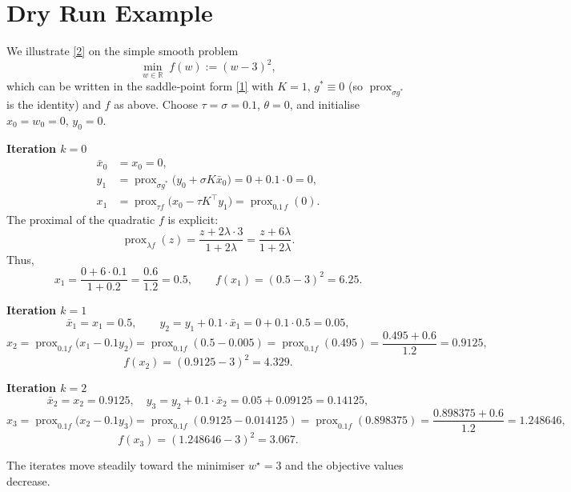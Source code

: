 \documentclass{article}
\newcommand{\prox}{\operatorname{prox}}
\begin{document}
\section*{Dry Run Example}
We illustrate \eqref{2} on the simple smooth problem
\[
\min_{w\in\mathbb{R}} \; f(w):=(w-3)^{2},
\tag{4}
\]
which can be written in the saddle‑point form \eqref{1} with $K=1$, $g^{*}\equiv0$ (so $\prox_{\sigma g^{*}}$ is the identity) and $f$ as above.  
Choose $\tau=\sigma=0.1$, $\theta=0$, and initialise $x_{0}=w_{0}=0$, $y_{0}=0$.

\medskip
\noindent\textbf{Iteration $k=0$}
\begin{align*}
\bar x_{0} &= x_{0}=0,\\
y_{1} &= \prox_{\sigma g^{*}}\bigl(y_{0}+\sigma K\bar x_{0}\bigr)=0+0.1\cdot0=0,\\
x_{1} &= \prox_{\tau f}\bigl(x_{0}-\tau K^{\top}y_{1}\bigr)
      = \prox_{0.1\,f}(0) .
\end{align*}
The proximal of the quadratic $f$ is explicit:
\[
\prox_{\lambda f}(z)=\frac{z+2\lambda\cdot3}{1+2\lambda}= \frac{z+6\lambda}{1+2\lambda}.
\]
Thus,
\[
x_{1}= \frac{0+6\cdot0.1}{1+0.2}= \frac{0.6}{1.2}=0.5,
\qquad
f(x_{1})=(0.5-3)^{2}=6.25 .
\]

\noindent\textbf{Iteration $k=1$}
\[
\bar x_{1}=x_{1}=0.5,
\qquad
y_{2}= y_{1}+0.1\cdot\bar x_{1}=0+0.1\cdot0.5=0.05,
\]
\[
x_{2}= \prox_{0.1 f}\bigl(x_{1}-0.1 y_{2}\bigr)
      =\prox_{0.1 f}(0.5-0.005)=\prox_{0.1 f}(0.495)
      =\frac{0.495+0.6}{1.2}=0.9125,
\]
\[
f(x_{2})=(0.9125-3)^{2}=4.329.
\]

\noindent\textbf{Iteration $k=2$}
\[
\bar x_{2}=x_{2}=0.9125,\quad
y_{3}= y_{2}+0.1\cdot\bar x_{2}=0.05+0.09125=0.14125,
\]
\[
x_{3}= \prox_{0.1 f}\bigl(x_{2}-0.1 y_{3}\bigr)
      =\prox_{0.1 f}(0.9125-0.014125)=\prox_{0.1 f}(0.898375)
      =\frac{0.898375+0.6}{1.2}=1.248646,
\]
\[
f(x_{3})=(1.248646-3)^{2}=3.067.
\]

The iterates move steadily toward the minimiser $w^{\star}=3$ and the objective values decrease.
\end{document}
